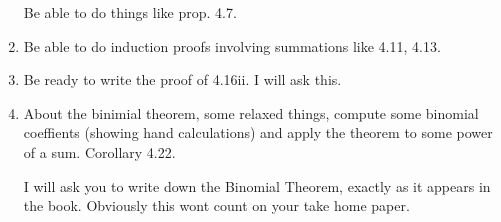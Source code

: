 \documentclass[12pt]{article}
\begin{document}
\begin{enumerate}
Be able to do things like prop. 4.7.

\item  Be able to do induction proofs involving summations like 4.11, 4.13.

\item  Be ready to write the proof of 4.16ii.  I will ask this.

\item  About the binimial theorem, some relaxed things, compute some binomial coeffients (showing hand calculations) and apply the theorem to some power of a sum.
Corollary 4.22.

I will ask you to write down the Binomial Theorem, exactly as it appears in the book.  Obviously this wont count on your take home paper.

\end{enumerate}
\end{document}
